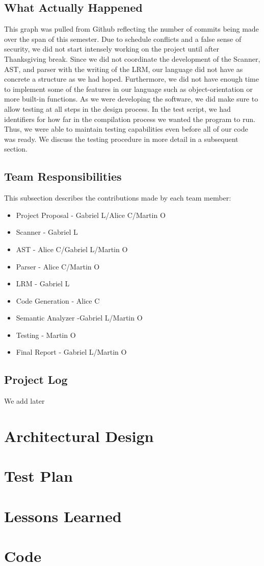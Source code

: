 \documentclass[11pt]{report}
\begin{document}
\section{What Actually Happened}
This graph was pulled from Github reflecting the number of commits being made over the span of this semester. Due to schedule conflicts and a false sense of security, we did not start intensely working on the project until after Thanksgiving break. Since we did not coordinate the development of the Scanner, AST, and parser with the writing of the LRM, our language did not have as concrete a structure as we had hoped. Furthermore, we did not have enough time to implement some of the features in our language such as object-orientation or more built-in functions. As we were developing the software, we did make sure to allow testing at all steps in the design process. In the test script, we had identifiers for how far in the compilation process we wanted the program to run. Thus, we were able to maintain testing capabilities even before all of our code was ready. We discuss the testing procedure in more detail in a subsequent section. 

\section{Team Responsibilities}
This subsection describes the contributions made by each team member:
\begin{itemize}
\item Project Proposal - Gabriel L/Alice C/Martin O
\item Scanner - Gabriel L
\item AST - Alice C/Gabriel L/Martin O
\item Parser - Alice C/Martin O
\item LRM - Gabriel L
\item Code Generation - Alice C
\item Semantic Analyzer -Gabriel L/Martin O
\item Testing - Martin O 
\item Final Report - Gabriel L/Martin O
\end{itemize}

\section{Project Log}
We add later 

\chapter{Architectural Design}
\chapter{Test Plan}
\chapter{Lessons Learned}
\appendix
\chapter{Code}
\end{document}
